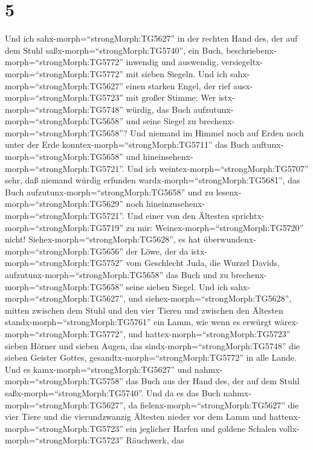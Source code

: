 \hypertarget{section-4}{%
\section{5}\label{section-4}}

 Und ich sahx-morph=``strongMorph:TG5627'' in der rechten
Hand des, der auf dem Stuhl saßx-morph=``strongMorph:TG5740'', ein Buch,
beschriebenx-morph=``strongMorph:TG5772'' inwendig und auswendig,
versiegeltx-morph=``strongMorph:TG5772'' mit sieben Siegeln.
 Und ich sahx-morph=``strongMorph:TG5627'' einen starken
Engel, der rief ausx-morph=``strongMorph:TG5723'' mit großer Stimme: Wer
istx-morph=``strongMorph:TG5748'' würdig, das Buch
aufzutunx-morph=``strongMorph:TG5658'' und seine Siegel zu
brechenx-morph=``strongMorph:TG5658''?  Und niemand im
Himmel noch auf Erden noch unter der Erde
konntex-morph=``strongMorph:TG5711'' das Buch
auftunx-morph=``strongMorph:TG5658'' und
hineinsehenx-morph=``strongMorph:TG5721''.  Und ich
weintex-morph=``strongMorph:TG5707'' sehr, daß niemand würdig erfunden
wardx-morph=``strongMorph:TG5681'', das Buch
aufzutunx-morph=``strongMorph:TG5658'' und zu
lesenx-morph=``strongMorph:TG5629'' noch
hineinzusehenx-morph=``strongMorph:TG5721''.  Und einer von
den Ältesten sprichtx-morph=``strongMorph:TG5719'' zu mir:
Weinex-morph=``strongMorph:TG5720'' nicht!
Siehex-morph=``strongMorph:TG5628'', es hat
überwundenx-morph=``strongMorph:TG5656'' der Löwe, der da
istx-morph=``strongMorph:TG5752'' vom Geschlecht Juda, die Wurzel
Davids, aufzutunx-morph=``strongMorph:TG5658'' das Buch und zu
brechenx-morph=``strongMorph:TG5658'' seine sieben Siegel. 
Und ich sahx-morph=``strongMorph:TG5627'', und
siehex-morph=``strongMorph:TG5628'', mitten zwischen dem Stuhl und den
vier Tieren und zwischen den Ältesten
standx-morph=``strongMorph:TG5761'' ein Lamm, wie wenn es erwürgt
wärex-morph=``strongMorph:TG5772'', und
hattex-morph=``strongMorph:TG5723'' sieben Hörner und sieben Augen, das
sindx-morph=``strongMorph:TG5748'' die sieben Geister Gottes,
gesandtx-morph=``strongMorph:TG5772'' in alle Lande.  Und es
kamx-morph=``strongMorph:TG5627'' und nahmx-morph=``strongMorph:TG5758''
das Buch aus der Hand des, der auf dem Stuhl
saßx-morph=``strongMorph:TG5740''.  Und da es das Buch
nahmx-morph=``strongMorph:TG5627'', da
fielenx-morph=``strongMorph:TG5627'' die vier Tiere und die
vierundzwanzig Ältesten nieder vor dem Lamm und
hattenx-morph=``strongMorph:TG5723'' ein jeglicher Harfen und goldene
Schalen vollx-morph=``strongMorph:TG5723'' Räuchwerk, das
